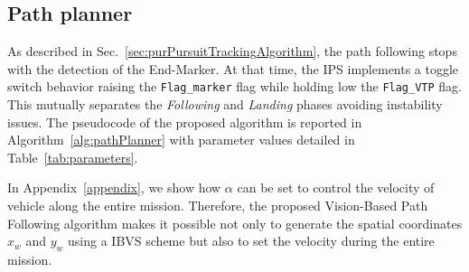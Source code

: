 \documentclass[a4paper,twocolumn,10pt]{article}
\begin{document}
    \subsection{Path planner}
    \label{sec:pathPlanner}

    As described in Sec.~\ref{sec:purPursuitTrackingAlgorithm}, the path following stops with the detection of the End-Marker. At that time, the IPS implements a toggle switch behavior raising the \texttt{Flag\_marker} flag while holding low the \texttt{Flag\_VTP} flag. This mutually separates the \textit{Following} and \textit{Landing} phases avoiding instability issues. The 
    pseudocode of the proposed algorithm is reported in Algorithm~\ref{alg:pathPlanner} with parameter 
    values detailed in Table~\ref{tab:parameters}.

    In Appendix~\ref{appendix}, we show how $\alpha$ can be set to control the velocity of vehicle along the entire mission. Therefore, the proposed Vision-Based Path Following algorithm makes it possible not only to generate the spatial coordinates $x_w$ and $y_w$ using a IBVS scheme but also to set the velocity during the entire mission.
\end{document}
